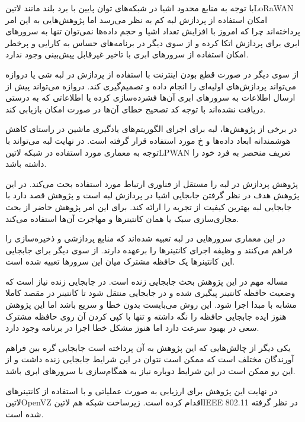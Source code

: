 
با توجه به منابع محدود اشیا در شبکه‌های توان پایین با برد بلند مانند ‌لاتین{LoRaWAN} امکان استفاده از پردازش لبه کم به نظر می‌رسد اما پژوهش‌هایی به این امر پرداخته‌اند
چرا که امروز با افزایش تعداد اشیا و حجم داده‌ها نمی‌توان تنها به سرورهای ابری برای پردازش اتکا کرده و از سوی دیگر در برنامه‌های حساس به کارایی و پرخطر امکان استفاده از سرورهای
ابری با تاخیر غیرقابل پیش‌بینی وجود ندارد.

از سوی دیگر در صورت قطع بودن اینترنت با استفاده از پردازش در لبه شی یا دروازه می‌تواند پردازش‌های اولیه‌ای را انجام داده و تصمیم‌گیری کند.
دروازه می‌تواند پیش از ارسال اطلاعات به سرورهای ابری آن‌ها فشرده‌سازی کرده یا اطلاعاتی که به درستی دریافت نشده‌اند با توجه کد تصحیح خطای آن‌ها
در صورت امکان بازیابی کند.

در برخی از پژوهش‌ها، لبه برای اجرای الگوریتم‌های یادگیری ماشین در راستای کاهش هوشمندانه ابعاد داده‌ها و ‌خ مورد استفاده قرار گرفته است.
در نهایت لبه می‌تواند با توجه به معماری مورد استفاده در شبکه ‌لاتین{LPWAN} تعریف منحصر به فرد خود را داشته باشد.


پژوهش  پردازش در لبه را مستقل از فناوری ارتباط مورد استفاده بحث می‌کند. در این پژوهش هدف در نظر گرفتن جابجایی اشیا در پردازش لبه است و پژوهش قصد دارد
با جابجایی لبه بهترین کیفیت از تجربه را ارائه کند. برای این امر پژوهش حاضر از بحث مجازی‌سازی سبک یا همان کانتینرها و مهاجرت آن‌ها استفاده می‌کند.

در این معماری سرورهایی در لبه تعبیه شده‌اند که منابع پردازشی و ذخیره‌سازی را فراهم می‌کنند و وظیفه اجرای کانتینرها را برعهده دارند. از سوی دیگر برای جابجایی این کانتینرها یک حافظه مشترک
میان این سرورها تعبیه شده است.

مساله مهم در این پژوهش بحث جابجایی زنده است. در جابجایی زنده نیاز است که وضعیت حافظه کانتینر پیگیری شده و در جابجایی منتقل شود تا کانتینر در مقصد کاملا مشابه با مبدا اجرا شود.
این روش می‌بایست بدون خطا و سریع باشد اما این پژوهش هنوز ایده جابجایی حافظه را نگه داشته و تنها با کپی کردن آن روی حافظه مشترک سعی در بهبود سرعت دارد اما هنوز مشکل خطا
اجرا در برنامه وجود دارد.

یکی دیگر از چالش‌هایی که این پژوهش به آن پرداخته است جابجایی گره بین فراهم آورندگان مختلف است که ممکن است نتوان در این شرایط جابجایی زنده داشت و از این رو ممکن است
در این شرایط دوباره نیاز به همگام‌سازی با سرورهای ابری باشد.

در نهایت این پژوهش برای ارزیابی به صورت عملیاتی و با استفاده از کانتینرهای ‌لاتین{OpenVZ} اقدام کرده است. زیرساخت شبکه هم ‌لاتین{IEEE 802.11} در نظر گرفته شده است.

